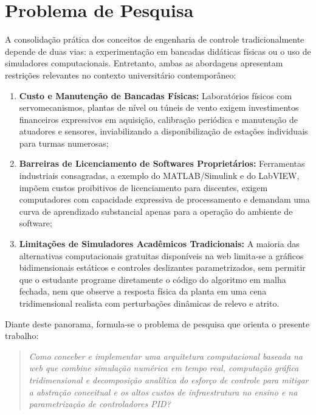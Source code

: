 \section{Problema de Pesquisa}
\label{sec:problema_pesquisa}

A consolidação prática dos conceitos de engenharia de controle tradicionalmente depende de duas vias: a experimentação em bancadas didáticas físicas ou o uso de simuladores computacionais. Entretanto, ambas as abordagens apresentam restrições relevantes no contexto universitário contemporâneo:

\begin{enumerate}[label=\alph*)]
    \item \textbf{Custo e Manutenção de Bancadas Físicas:} Laboratórios físicos com servomecanismos, plantas de nível ou túneis de vento exigem investimentos financeiros expressivos em aquisição, calibração periódica e manutenção de atuadores e sensores, inviabilizando a disponibilização de estações individuais para turmas numerosas;
    \item \textbf{Barreiras de Licenciamento de Softwares Proprietários:} Ferramentas industriais consagradas, a exemplo do MATLAB/Simulink e do LabVIEW, impõem custos proibitivos de licenciamento para discentes, exigem computadores com capacidade expressiva de processamento e demandam uma curva de aprendizado substancial apenas para a operação do ambiente de software;
    \item \textbf{Limitações de Simuladores Acadêmicos Tradicionais:} A maioria das alternativas computacionais gratuitas disponíveis na web limita-se a gráficos bidimensionais estáticos e controles deslizantes parametrizados, sem permitir que o estudante programe diretamente o código do algoritmo em malha fechada, nem que observe a resposta física da planta em uma cena tridimensional realista com perturbações dinâmicas de relevo e atrito.
\end{enumerate}

Diante deste panorama, formula-se o problema de pesquisa que orienta o presente trabalho:

\begin{quote}
\textit{Como conceber e implementar uma arquitetura computacional baseada na web que combine simulação numérica em tempo real, computação gráfica tridimensional e decomposição analítica do esforço de controle para mitigar a abstração conceitual e os altos custos de infraestrutura no ensino e na parametrização de controladores PID?}
\end{quote}

